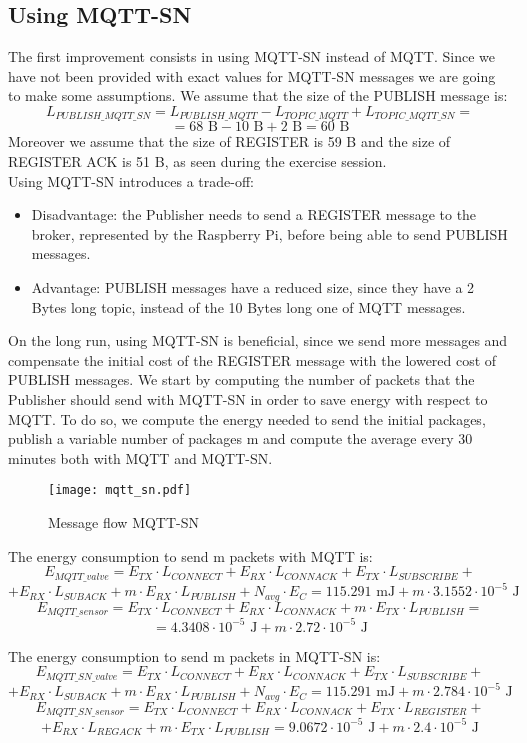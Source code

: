 \subsection{Using MQTT-SN}
The first improvement consists in using MQTT-SN instead of MQTT. Since we have not been provided with exact values for MQTT-SN messages we are going to make some assumptions. We assume that the size of the PUBLISH message is:
\[L_{PUBLISH\_MQTT\_SN} = L_{PUBLISH\_MQTT} - L_{TOPIC\_MQTT} + L_{TOPIC\_MQTT\_SN}  =\]
\[= 68 \text{ B} - 10 \text{ B} + 2 \text{ B} = 60 \text{ B} \]
Moreover we assume that the size of REGISTER is 59 B and the size of REGISTER ACK is 51 B, as seen during the exercise session.\\
Using MQTT-SN introduces a trade-off: 
\begin{itemize}
	\item Disadvantage: the Publisher needs to send a REGISTER message to the broker, represented by the Raspberry Pi, before being able to send PUBLISH messages.
	\item Advantage: PUBLISH messages have a reduced size, since they have a 2 Bytes long topic, instead of the 10 Bytes long one of MQTT messages.
\end{itemize}
On the long run, using MQTT-SN is beneficial, since we send more messages and compensate the initial cost of the REGISTER message with the lowered cost of PUBLISH messages. We start by computing the number of packets that the Publisher should send with MQTT-SN in order to save energy with respect to MQTT. To do so, we compute the energy needed to send the initial packages, publish a variable number of packages m and compute the average every 30 minutes both with MQTT and MQTT-SN.\\
\begin{figure}[H]
    \centering
    \texttt{[image: mqtt\_sn.pdf]}
    \caption{Message flow MQTT-SN}
\end{figure}
The energy consumption to send m packets with MQTT is:
\[E_{MQTT\_valve} = E_{TX} \cdot L_{CONNECT} + E_{RX} \cdot L_{CONNACK} + E_{TX} \cdot L_{SUBSCRIBE} +\]
\[+ E_{RX} \cdot L_{SUBACK} + m \cdot E_{RX} \cdot L_{PUBLISH} + N_{avg} \cdot E_{C} = 115.291 \text{ mJ} + m \cdot 3.1552 \cdot 10^{-5} \text{ J}\]
\[E_{MQTT\_sensor} = E_{TX} \cdot L_{CONNECT} + E_{RX} \cdot L_{CONNACK} + m \cdot E_{TX} \cdot L_{PUBLISH} =\]
\[= 4.3408 \cdot 10^{-5} \text{ J} + m \cdot 2.72 \cdot 10^{-5} \text{ J}\]

The energy consumption to send m packets in MQTT-SN is:
\[E_{MQTT\_SN\_valve} = E_{TX} \cdot L_{CONNECT} + E_{RX} \cdot L_{CONNACK} + E_{TX} \cdot L_{SUBSCRIBE} +\]
\[+ E_{RX} \cdot L_{SUBACK} + m \cdot E_{RX} \cdot L_{PUBLISH} + N_{avg} \cdot E_{C} = 115.291 \text{ mJ} + m \cdot 2.784 \cdot 10^{-5} \text{ J}\]
\[E_{MQTT\_SN\_sensor} = E_{TX} \cdot L_{CONNECT} + E_{RX} \cdot L_{CONNACK} + E_{TX} \cdot L_{REGISTER} +\]
\[+ E_{RX} \cdot L_{REGACK} + m \cdot E_{TX} \cdot L_{PUBLISH} = 9.0672 \cdot 10^{-5} \text{ J} + m \cdot 2.4 \cdot 10^{-5} \text{ J}\]


